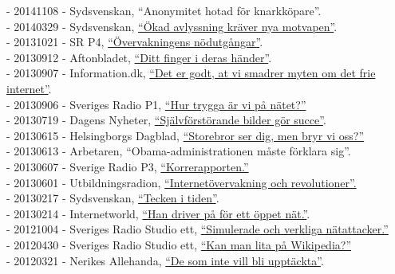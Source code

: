 \documentclass[a4paper,11pt,oneside]{article}
\begin{document}
    - 20141108 - Sydsvenskan, ``Anonymitet hotad för knarkköpare''. \\
    - 20140329 - Sydsvenskan, \href{http://www.sydsvenskan.se/2014-03-29/okad-avlyssning-kraver-nya-motvapen}{``Ökad avlyssning kräver nya motvapen''}.\\
    - 20131021 - SR P4, \href{http://t.sr.se/NC8sUF}{``Övervakningens nödutgångar''}. \\
    - 20130912 - Aftonbladet, \href{http://www.aftonbladet.se/nyheter/vetmer/article17455373.ab}{``Ditt finger i deras händer''}. \\
    - 20130907 - Information.dk, \href{http://www.information.dk/471440}{``Det er godt, at vi smadrer myten om det frie internet''}. \\
    - 20130906 - Sveriges Radio P1, \href{http://t.sr.se/OfP0gG}{``Hur trygga är vi på nätet?''} \\
    - 20130719 - Dagens Nyheter, \href{http://www.dn.se/kultur-noje/sjalvforstorande-bilder-gor-succe/}{``Självförstörande bilder gör succe''}. \\
    - 20130615 - Helsingborgs Dagblad, \href{http://www.hd.se/2013-06-15/storebror-ser-dig---men-bryr-vi-oss}{``Storebror ser dig, men bryr vi oss?''} \\
    - 20130613 - Arbetaren, ``Obama-administrationen måste förklara sig''. \\
    - 20130607 - Sverige Radio P3, \href{http://t.sr.se/MiZb35}{``Korrerapporten.''} \\
    - 20130601 - Utbildningsradion, \href{http://urskola.se/Produkter/176858-UR-Samtiden-Overvakning-och-kontroll-Internetovervakning-och-revolutioner}{``Internetövervakning och revolutioner''.} \\
    - 20130217 - Sydsvenskan, \href{http://www.sydsvenskan.se/2013-02-17/tecken-i-tiden}{``Tecken i tiden''}.\\
    - 20130214 - Internetworld, \href{http://www.idg.se/2.1085/1.492033/han-driver-pa-for-ett-oppet-nat}{``Han driver på för ett öppet nät.''}. \\
    - 20121004 - Sveriges Radio Studio ett, \href{http://t.sr.se/1foOdCK}{``Simulerade och verkliga nätattacker.''} \\
    - 20120430 - Sveriges Radio Studio ett, \href{http://t.sr.se/1cRSOfk}{``Kan man lita på Wikipedia?''} \\
    - 20120321 - Nerikes Allehanda, \href{http://na.se/nyheter/orebro/1.1589481--de-som-inte-vill-blir-inte-upptackta-}{``De som inte vill bli upptäckta''}. \\
\end{document}
